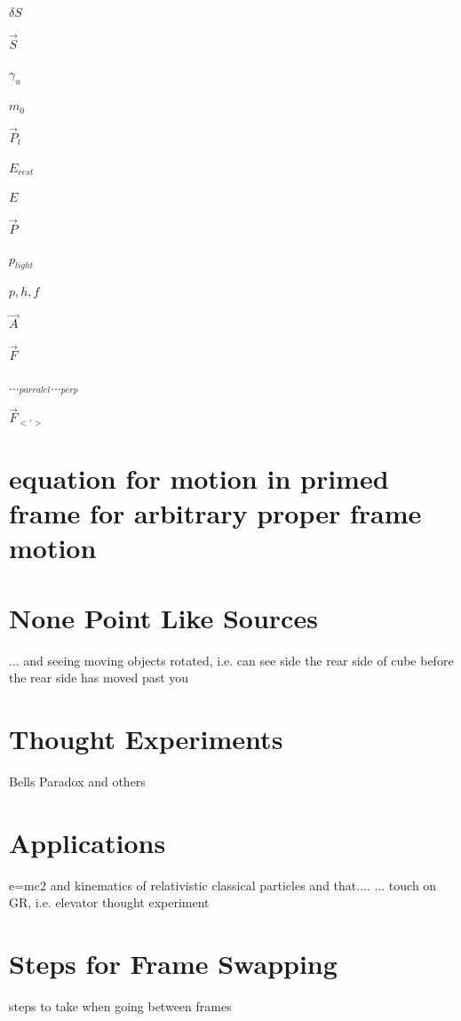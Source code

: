 $\delta S$ \newline

$\vec{S}$ \newline

$\gamma_u$ \newline

$m_0$ \newline

$\vec{P}_t$ \newline

$E_{rest}$ \newline

$E$ \newline

$\vec{P}$ \newline

$p_{light}$ \newline

$p, h, f$ \newline

$\vec{A}$ \newline

$\vec{F}$ \newline

$..._{parralel} ..._{perp}$ \newline

$\vec{F}_{<'>}$ \newline



\chapter{equation for motion in primed frame for arbitrary proper frame motion}

\chapter{None Point Like Sources}
... and seeing moving objects rotated, i.e. can see side the rear side of cube before the rear side has moved past you
\chapter{Thought Experiments}
Bells Paradox and others
\chapter{Applications}
e=mc2 and kinematics of relativistic classical particles and that....\newline
... touch on GR, i.e. elevator thought experiment
\chapter{Steps for Frame Swapping}

steps to take when going between frames